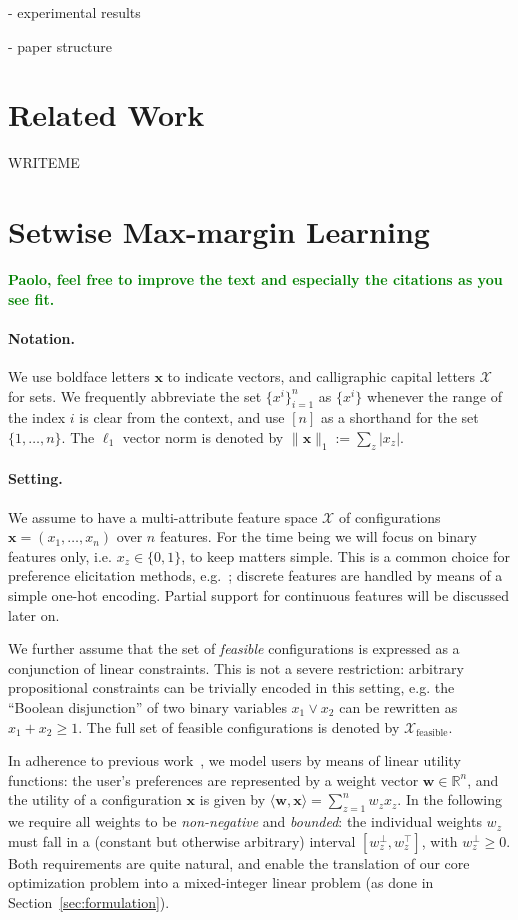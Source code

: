 \documentclass{article}
\renewcommand\[{\begin{equation}}
\renewcommand\]{\end{equation}}
\newcommand{\bbR}{\mathbb{R}}
\newcommand{\calvar}[1]{\ensuremath{\mathcal{#1}}}
\newcommand{\calX}{\calvar{X}}
\newcommand{\vecvar}[1]{\ensuremath{\boldsymbol{#1}}}
\newcommand{\vw}{\vecvar{w}}
\newcommand{\vx}{\vecvar{x}}
\newcommand{\stefano}[1]{{\bf \textcolor{green}{{\fbox{Stefano:} #1}}}}
\begin{document}
- experimental results

- paper structure


\section{Related Work}

WRITEME

\section{Setwise Max-margin Learning}

\stefano{Paolo, feel free to improve the text and especially the citations
as you see fit.}

\paragraph{Notation.} We use boldface letters $\vx$ to indicate vectors, and
calligraphic capital letters $\calX$ for sets. We frequently abbreviate the set
$\{ x^i \}_{i=1}^n$ as $\{ x^i \}$ whenever the range of the index $i$ is clear
from the context, and use $[n]$ as a shorthand for the set $\{1, \ldots, n\}$.
The $\ell_1$ vector norm is denoted by $\|\vx\|_1 := \sum_z |x_z|$.

\paragraph{Setting.} We assume to have a multi-attribute feature space $\calX$
of configurations $\vx = (x_1, \ldots, x_n)$ over $n$ features. For the time
being we will focus on binary features only, i.e. $x_z\in\{0,1\}$, to keep
matters simple. This is a common choice for preference elicitation methods,
e.g.~\cite{guo2010real,viappiani2010optimal}; discrete features are handled by
means of a simple one-hot encoding. Partial support for continuous features
will be discussed later on.

We further assume that the set of {\em feasible} configurations is expressed as
a conjunction of linear constraints. This is not a severe restriction:
arbitrary propositional constraints can be trivially encoded in this setting,
e.g. the ``Boolean disjunction'' of two binary variables $x_1 \lor x_2$ can be
rewritten as $x_1 + x_2 \ge 1$. The full set of feasible configurations is
denoted by $\calX_\text{feasible}$.

In adherence to previous work~\cite{guo2010real,viappiani2010optimal}, we model users by means
of linear utility functions: the user's preferences are represented by a weight
vector $\vw\in\bbR^n$, and the utility of a configuration $\vx$ is given by
$\langle \vw, \vx \rangle = \sum_{z=1}^n w_z x_z$. In the following we
require all weights to be {\em non-negative} and {\em bounded}: the individual
weights $w_z$ must fall in a (constant but otherwise arbitrary) interval
$[w^\bot_z, w^\top_z]$, with $w^\bot_z \ge 0$. Both requirements are quite
natural, and enable the translation of our core optimization problem into a
mixed-integer linear problem (as done in Section~\ref{sec:formulation}).
\end{document}
